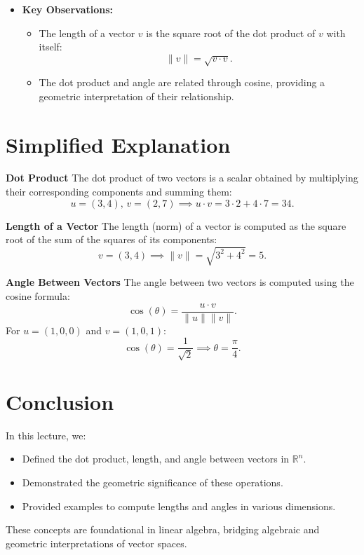 \documentclass{article}
\begin{document}
\begin{itemize}
  \item \textbf{Key Observations:}
    \begin{itemize}
      \item The length of a vector $v$ is the square root of the dot product of $v$ with itself:
        \[
          \|v\| = \sqrt{v \cdot v}.
        \]
      \item The dot product and angle are related through cosine, providing a geometric interpretation of their relationship.
    \end{itemize}
\end{itemize}

\section*{Simplified Explanation}

\textbf{Dot Product}
The dot product of two vectors is a scalar obtained by multiplying their corresponding components and summing them:
\[
  u = (3, 4), \, v = (2, 7) \implies u \cdot v = 3 \cdot 2 + 4 \cdot 7 = 34.
\]

\textbf{Length of a Vector}
The length (norm) of a vector is computed as the square root of the sum of the squares of its components:
\[
  v = (3, 4) \implies \|v\| = \sqrt{3^2 + 4^2} = 5.
\]

\textbf{Angle Between Vectors}
The angle between two vectors is computed using the cosine formula:
\[
  \cos(\theta) = \frac{u \cdot v}{\|u\| \|v\|}.
\]
For $u = (1, 0, 0)$ and $v = (1, 0, 1)$:
\[
  \cos(\theta) = \frac{1}{\sqrt{2}} \implies \theta = \frac{\pi}{4}.
\]

\section*{Conclusion}

In this lecture, we:
\begin{itemize}
  \item Defined the dot product, length, and angle between vectors in $\mathbb{R}^n$.
  \item Demonstrated the geometric significance of these operations.
  \item Provided examples to compute lengths and angles in various dimensions.
\end{itemize}

These concepts are foundational in linear algebra, bridging algebraic and geometric interpretations of vector spaces.
\end{document}
